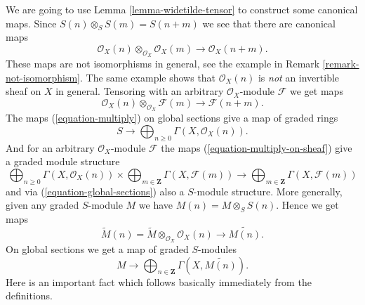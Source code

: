 \noindent
We are going to use Lemma \ref{lemma-widetilde-tensor}
to construct some canonical maps.
Since $S(n) \otimes_S S(m) = S(n + m)$ we see that there
are canonical maps
\begin{equation}
\label{equation-multiply}
\mathcal{O}_X(n) \otimes_{\mathcal{O}_X} \mathcal{O}_X(m)
\longrightarrow
\mathcal{O}_X(n + m).
\end{equation}
These maps are not isomorphisms in general, see the example in
Remark \ref{remark-not-isomorphism}. The same example shows
that $\mathcal{O}_X(n)$ is {\it not} an invertible sheaf on $X$ in
general. Tensoring with an arbitrary $\mathcal{O}_X$-module $\mathcal{F}$
we get maps
\begin{equation}
\label{equation-multiply-on-sheaf}
\mathcal{O}_X(n) \otimes_{\mathcal{O}_X} \mathcal{F}(m)
\longrightarrow
\mathcal{F}(n + m).
\end{equation}
The maps (\ref{equation-multiply}) on global sections give a map of graded
rings
\begin{equation}
\label{equation-global-sections}
S \longrightarrow \bigoplus\nolimits_{n \geq 0} \Gamma(X, \mathcal{O}_X(n)).
\end{equation}
And for an arbitrary $\mathcal{O}_X$-module $\mathcal{F}$ the maps
(\ref{equation-multiply-on-sheaf}) give a graded module structure
\begin{equation}
\label{equation-global-sections-module}
\bigoplus\nolimits_{n \geq 0} \Gamma(X, \mathcal{O}_X(n))
\times
\bigoplus\nolimits_{m \in \mathbf{Z}} \Gamma(X, \mathcal{F}(m))
\longrightarrow
\bigoplus\nolimits_{m \in \mathbf{Z}} \Gamma(X, \mathcal{F}(m))
\end{equation}
and via (\ref{equation-global-sections}) also a $S$-module structure.
More generally, given any graded $S$-module
$M$ we have $M(n) = M \otimes_S S(n)$. Hence we get maps
\begin{equation}
\label{equation-multiply-more-generally}
\widetilde M(n)
=
\widetilde M
\otimes_{\mathcal{O}_X}
\mathcal{O}_X(n)
\longrightarrow
\widetilde{M(n)}.
\end{equation}
On global sections we get a map of graded $S$-modules
\begin{equation}
\label{equation-global-sections-more-generally}
M \longrightarrow
\bigoplus\nolimits_{n \in \mathbf{Z}} \Gamma(X, \widetilde{M(n)}).
\end{equation}
Here is an important fact which follows basically immediately from the
definitions.

